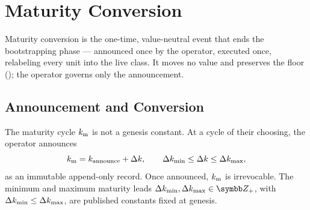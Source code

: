 \documentclass[../main.tex]{subfiles}
\begin{document}
%
%
%

\section{Maturity Conversion}
\label{sec:attestation:maturity}

Maturity conversion is the one-time, value-neutral event that ends the bootstrapping phase
--- announced once by the operator, executed once, relabeling every \tlockclass{} unit into
the live class. It moves no value and preserves the floor
(); the operator governs only the
announcement.

\subsection{Announcement and Conversion}
\label{sec:maturity:announcement-conversion}

\begin{postulate}
    \label{postc:maturity:announcement}
    The maturity cycle $k\sb{\mathrm{m}}$ is not a genesis constant. At a cycle of their choosing,
    the operator announces
    \[
        k\sb{\mathrm{m}} = k_{\mathrm{announce}} + \Delta k,
        \qquad
        \Delta k\sb{\min} \leq \Delta k \leq \Delta k\sb{\max},
    \]
    as an immutable append-only record. Once announced, $k\sb{\mathrm{m}}$ is irrevocable. The
    minimum and maximum maturity leads $\matlead, \matleadcap \in \IntPos$, with
    $\Delta k\sb{\min} \leq \Delta k\sb{\max}$, are published constants fixed at genesis.
\end{postulate}
\end{document}
